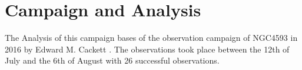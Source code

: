 \chapter{Campaign and Analysis}
The Analysis of this campaign bases of the observation campaign of NGC4593 in 2016 by Edward M. Cackett \cite{cackett2018accretion}. The observations took place between the 12th of July and the 6th of August with 26 successful observations.